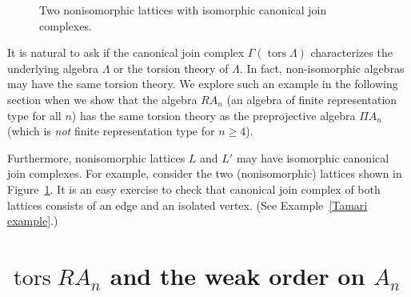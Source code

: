 \documentclass[ALCO,ThmDefs,Unicode,epreuves]{cedram}
\DeclareMathOperator{\tors}{tors}
\renewcommand{\1}{\hat{1}}
\newcommand{\0}{\hat{0}}
\begin{document}
\begin{figure}[htb]
\centering
{}
\caption{Two nonisomorphic lattices with isomorphic canonical join complexes.}
\label{fig: noniso}
\end{figure}

\begin{remark}\label{isomorphism}
\normalfont
It is natural to ask if the canonical join complex $\Gamma(\tors \Lambda)$ characterizes the underlying algebra $\Lambda$ or the torsion theory of $\Lambda$.
In fact, non-isomorphic algebras may have the same torsion theory.
We explore such an example in the following section when we show that the algebra $RA_n$ (an algebra of finite representation type for all $n$) has the same torsion theory as the preprojective algebra $\Pi A_n$ (which is \emph{not} finite representation type for $n\ge 4$).

Furthermore, nonisomorphic lattices $L$ and $L'$ may have isomorphic canonical join complexes.
For example, consider the two (nonisomorphic) lattices shown in Figure~\ref{fig: noniso}.
It is an easy exercise to check that canonical join complex of both lattices consists of an edge and an isolated vertex.
(See Example~\ref{Tamari example}.)
\end{remark}



\section{\texorpdfstring{$\tors RA_n$}{tors RAn} and the weak order on \texorpdfstring{$A_n$}{An}}
\label{sec:example:-shards}
\end{document}
